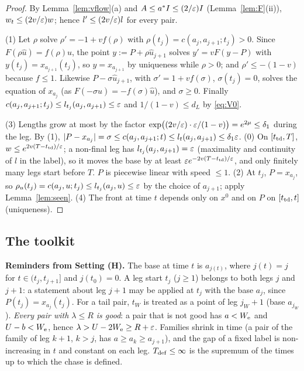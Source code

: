 \begin{proof}
By Lemma~\ref{lem:vflow}(a) and $A\le a^*I\le(2/\varepsilon)I$ (Lemma~\ref{lem:F}(ii)), $w_t\le(2v/\varepsilon)w$; hence
$l'\le(2v/\varepsilon)l$ for every pair.

(1) Let $\rho$ solve $\rho'=-1+vf(\rho)$ with $\rho(t_j)=c(a_j,a_{j+1};t_j)>0$. Since $F(\rho\hat u)=f(\rho)\hat u$,
the point $y:=P+\rho\hat u_{j+1}$ solves $y'=vF(y-P)$ with $y(t_j)=x_{a_{j+1}}(t_j)$, so $y=x_{a_{j+1}}$ by uniqueness
while $\rho>0$; and $\rho'\le-(1-v)$ because $f\le1$. Likewise $P-\sigma\hat u_{j+1}$, with $\sigma'=1+vf(\sigma)$,
$\sigma(t_j)=0$, solves the equation of $x_{a_j}$ (as $F(-\sigma\hat u)=-f(\sigma)\hat u$), and $\sigma\ge0$. Finally
$c(a_j,a_{j+1};t_j)\le l_{t_j}(a_j,a_{j+1})\le\varepsilon$ and $1/(1-v)\le d_L$ by \eqref{eq:V0}.

(3) Lengths grow at most by the factor $\exp\bigl((2v/\varepsilon)\cdot\varepsilon/(1-v)\bigr)=e^{2\mu}\le\delta_1$ during the leg.
By (1), $|P-x_{a_j}|=\sigma\le c(a_j,a_{j+1};t)\le l_t(a_j,a_{j+1})\le\delta_1\varepsilon$.
(0) On $[t_{\mathrm{td}},T]$, $w\le e^{2v(T-t_{\mathrm{td}})/\varepsilon}$; a non-final leg has $l_{t_j}(a_j,a_{j+1})=\varepsilon$ (maximality and
continuity of $l$ in the label), so it moves the base by at least $\varepsilon e^{-2v(T-t_{\mathrm{td}})/\varepsilon}$, and only finitely many
legs start before $T$. $P$ is piecewise linear with speed $\le1$.
(2) At $t_j$, $P=x_{a_j}$, so $\rho_u(t_j)=c(a_j,u;t_j)\le l_{t_j}(a_j,u)\le\varepsilon$ by the choice of $a_{j+1}$; apply
Lemma~\ref{lem:seen}. (4) The front at time $t$ depends only on $x^0$ and on $P$ on $[t_{\mathrm{td}},t]$ (uniqueness).
\end{proof}

\subsection{The toolkit}\label{app:walk:tools}

\textbf{Reminders from Setting (H).} The base at time $t$ is $a_{j(t)}$, where $j(t)=j$ for $t\in(t_j,t_{j+1}]$ and
$j(t_0)=0$. A leg start $t_j$ ($j\ge1$) belongs to both legs $j$ and $j+1$: a statement about leg $j+1$ may be applied
at $t_j$ with the base $a_j$, since $P(t_j)=x_{a_j}(t_j)$. For a tail pair, $t_W$ is treated as a point of leg
$j_W+1$ (base $a_{j_W}$). \emph{Every pair with $\lambda\le R$ is good}: a pair that is not good has $a<W_{\mathrm{e}}$ and
$U-b<W_{\mathrm{e}}$, hence $\lambda>U-2W_{\mathrm{e}}\ge R+\varepsilon$. Families shrink in time (a pair of the family of leg $k+1$, $k>j$, has
$a\ge a_k\ge a_{j+1}$), and the gap of a fixed label is non-increasing in $t$ and constant on each leg. $T_{\mathrm{def}}\le\infty$
is the supremum of the times up to which the chase is defined.

